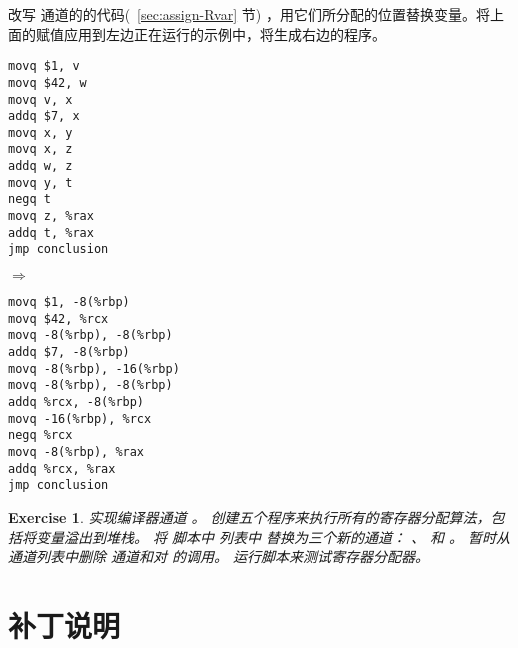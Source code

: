 \documentclass[11pt]{book}
\newtheorem{exercise}[theorem]{Exercise}
\begin{document}
改写  通道的的代码(~\ref{sec:assign-Rvar} 节) ，用它们所分配的位置替换变量。将上面的赋值应用到左边正在运行的示例中，将生成右边的程序。
\begin{center}
  \begin{minipage}{0.3\textwidth}
\begin{lstlisting}
movq $1, v
movq $42, w
movq v, x
addq $7, x
movq x, y
movq x, z
addq w, z
movq y, t
negq t
movq z, %rax
addq t, %rax
jmp conclusion
\end{lstlisting}
\end{minipage}
$\Rightarrow\qquad$
\begin{minipage}{0.45\textwidth}
\begin{lstlisting}
movq $1, -8(%rbp)
movq $42, %rcx
movq -8(%rbp), -8(%rbp)
addq $7, -8(%rbp)
movq -8(%rbp), -16(%rbp)
movq -8(%rbp), -8(%rbp)
addq %rcx, -8(%rbp)
movq -16(%rbp), %rcx
negq %rcx
movq -8(%rbp), %rax
addq %rcx, %rax
jmp conclusion
\end{lstlisting}
\end{minipage}
\end{center}

\begin{exercise}\normalfont
%
实现编译器通道  。
%
创建五个程序来执行所有的寄存器分配算法，包括将变量溢出到堆栈。
%
将 脚本中  列表中  替换为三个新的通道：
 、 和
 。
%
暂时从通道列表中删除  通道和对  的调用。
%
运行脚本来测试寄存器分配器。
\end{exercise}


\section{补丁说明}
\label{sec:patch-instructions}
\end{document}
